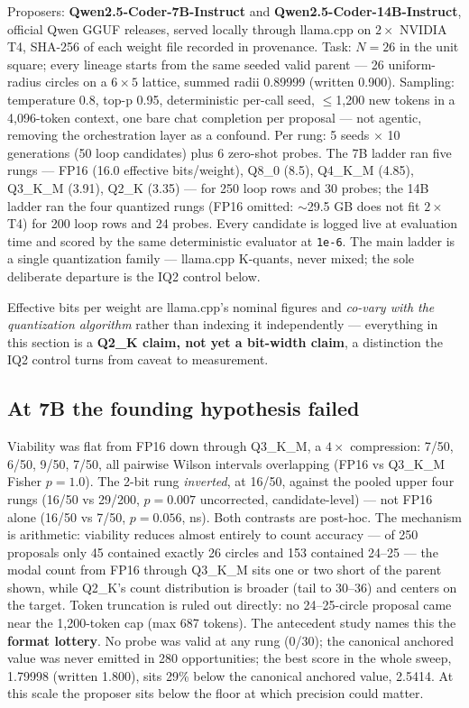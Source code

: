 Proposers: \textbf{Qwen2.5-Coder-7B-Instruct} and \textbf{Qwen2.5-Coder-14B-Instruct}, official Qwen GGUF releases, served locally through llama.cpp on $2 \times$ NVIDIA T4, SHA-256 of each weight file recorded in provenance. Task: $N = 26$ in the unit square; every lineage starts from the same seeded valid parent --- 26 uniform-radius circles on a $6 \times 5$ lattice, summed radii 0.89999 (written 0.900). Sampling: temperature 0.8, top-p 0.95, deterministic per-call seed, $\le$1,200 new tokens in a 4,096-token context, one bare chat completion per proposal --- not agentic, removing the orchestration layer as a confound. Per rung: 5 seeds $\times$ 10 generations (50 loop candidates) plus 6 zero-shot probes. The 7B ladder ran five rungs --- FP16 (16.0 effective bits/weight), Q8\_0 (8.5), Q4\_K\_M (4.85), Q3\_K\_M (3.91), Q2\_K (3.35) --- for 250 loop rows and 30 probes; the 14B ladder ran the four quantized rungs (FP16 omitted: $\sim$29.5 GB does not fit $2 \times$ T4) for 200 loop rows and 24 probes. Every candidate is logged live at evaluation time and scored by the same deterministic evaluator at \texttt{1e-6}. The main ladder is a single quantization family --- llama.cpp K-quants, never mixed; the sole deliberate departure is the IQ2 control below.

Effective bits per weight are llama.cpp's nominal figures and \emph{co-vary with the quantization algorithm} rather than indexing it independently --- everything in this section is a \textbf{Q2\_K claim, not yet a bit-width claim}, a distinction the IQ2 control turns from caveat to measurement.

\subsection{At 7B the founding hypothesis failed}

Viability was flat from FP16 down through Q3\_K\_M, a $4\times$ compression: 7/50, 6/50, 9/50, 7/50, all pairwise Wilson intervals overlapping (FP16 vs Q3\_K\_M Fisher $p = 1.0$). The 2-bit rung \emph{inverted}, at 16/50, against the pooled upper four rungs (16/50 vs 29/200, $p = 0.007$ uncorrected, candidate-level) --- not FP16 alone (16/50 vs 7/50, $p = 0.056$, ns). Both contrasts are post-hoc. The mechanism is arithmetic: viability reduces almost entirely to count accuracy --- of 250 proposals only 45 contained exactly 26 circles and 153 contained 24--25 --- the modal count from FP16 through Q3\_K\_M sits one or two short of the parent shown, while Q2\_K's count distribution is broader (tail to 30--36) and centers on the target. Token truncation is ruled out directly: no 24--25-circle proposal came near the 1,200-token cap (max 687 tokens). The antecedent study names this the \textbf{format lottery}. No probe was valid at any rung (0/30); the canonical anchored value was never emitted in 280 opportunities; the best score in the whole sweep, 1.79998 (written 1.800), sits 29\% below the canonical anchored value, 2.5414. At this scale the proposer sits below the floor at which precision could matter.

